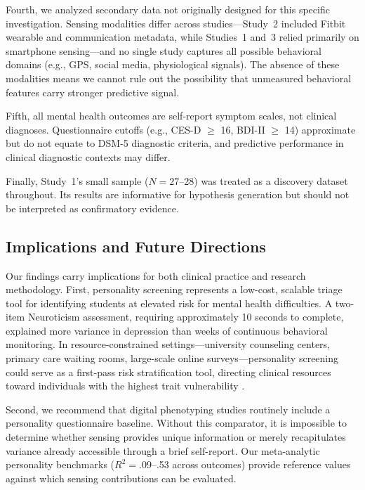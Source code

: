\documentclass[12pt, a4paper]{article}
\begin{document}
Fourth, we analyzed secondary data not originally designed for this specific investigation. Sensing modalities differ across studies---Study~2 included Fitbit wearable and communication metadata, while Studies~1 and~3 relied primarily on smartphone sensing---and no single study captures all possible behavioral domains (e.g., GPS, social media, physiological signals). The absence of these modalities means we cannot rule out the possibility that unmeasured behavioral features carry stronger predictive signal.

Fifth, all mental health outcomes are self-report symptom scales, not clinical diagnoses. Questionnaire cutoffs (e.g., CES-D $\geq$ 16, BDI-II $\geq$ 14) approximate but do not equate to DSM-5 diagnostic criteria, and predictive performance in clinical diagnostic contexts may differ.

Finally, Study~1's small sample ($N = 27$--28) was treated as a discovery dataset throughout. Its results are informative for hypothesis generation but should not be interpreted as confirmatory evidence.

\subsection{Implications and Future Directions}

Our findings carry implications for both clinical practice and research methodology. First, personality screening represents a low-cost, scalable triage tool for identifying students at elevated risk for mental health difficulties. A two-item Neuroticism assessment, requiring approximately 10 seconds to complete, explained more variance in depression than weeks of continuous behavioral monitoring. In resource-constrained settings---university counseling centers, primary care waiting rooms, large-scale online surveys---personality screening could serve as a first-pass risk stratification tool, directing clinical resources toward individuals with the highest trait vulnerability \citep{lahey2009public}.

Second, we recommend that digital phenotyping studies routinely include a personality questionnaire baseline. Without this comparator, it is impossible to determine whether sensing provides unique information or merely recapitulates variance already accessible through a brief self-report. Our meta-analytic personality benchmarks ($R^2 = .09$--.53 across outcomes) provide reference values against which sensing contributions can be evaluated.
\end{document}
